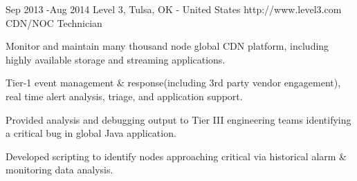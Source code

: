 \documentclass[10pt]{article} %
\begin{document}

\job
{Sep 2013 -}{Aug 2014}
{Level 3, Tulsa, OK - United States}
{http://www.level3.com}
{CDN/NOC Technician}
{
\begin{itemize-noindent}
\item{Monitor and maintain many thousand node global CDN platform, including highly available storage and streaming applications.}
\item{Tier-1 event management \& response(including 3rd party vendor engagement), real time alert analysis, triage, and application support.}
\item{Provided analysis and debugging output to Tier III engineering teams identifying a critical bug in global Java application.}
\item{Developed scripting to identify nodes approaching critical via historical alarm \& monitoring data analysis.}
\end{itemize-noindent}

}

\end{document}
